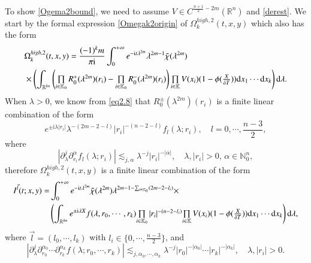 \documentclass[11pt,reqno]{amsart}
\def\d{{\rm d}}
\def\i{{\rm i}}
\numberwithin{equation}{section}
\theoremstyle{definition}
\begin{document}
To show \eqref{Ogema2bound}, we need to assume $V\in C^{\frac{n+1}{2}-2m}(\mathbb{R}^n)$ and \eqref{derest}. We start by the formal expression \eqref{Omegak2origin} of $\Omega_k^{high,2}(t,x,y)$ which also has the form
\begin{equation*}\label{Omegak2origin'}
	\begin{split}
		&\Omega_k^{high,2}(t,x,y)=\frac{(-1)^km}{\pi\i}\int_0^{+\infty}e^{-\mathrm{i}t\lambda^{2m}}\lambda^{2m-1}\tilde{\chi}(\lambda^{2m})\\
		&\times\left(\int_{\mathbb{R}^{kn}}\left(\mbox{$\prod\limits_{i\in\mathbb{K}_0}R_0^+(\lambda^{2m})(r_i)-\prod\limits_{i\in\mathbb{K}_0}R_0^-(\lambda^{2m})(r_i)$}\right)\mbox{$\prod\limits_{i\in\mathbb{K}}V(x_i)$}(1-\phi(\mbox{$\frac{X}{\delta T}$}))\d x_1\cdots \d x_k\right)\d\lambda.
	\end{split}
\end{equation*}
When $\lambda>0$, we know from \eqref{eq2.8} that $R_0^\pm(\lambda^{2m})(r_i)$ is a finite linear combination of the form
\begin{equation*}
	e^{\pm\mathrm{i}\lambda|r_i|}\lambda^{-(2m-2-l)}|r_i|^{-(n-2-l)}f_l(\lambda;r_i),\quad\mbox{$l=0,\cdots,\frac{n-3}{2}$},
\end{equation*}
where
\begin{equation*}
	|\partial_\lambda^j\partial_{r_i}^\alpha f_l(\lambda;r_i)|\lesssim_{j,\alpha}\lambda^{-j}|r_i|^{-|\alpha|},\quad\lambda,|r_i|>0,\,\alpha\in\mathbb{N}_0^n,
\end{equation*}
therefore $\Omega_k^{high,2}(t,x,y)$ is a finite linear combination of the form
\begin{equation}\label{Ivecl}
	\begin{split}
		I^{\vec{l}}(t;x,y)=&\int_0^{+\infty}e^{-\mathrm{i}t\lambda^{2m}}\tilde{\chi}(\lambda^{2m})\lambda^{2m-1-\sum_{i\in\mathbb{K}_0}(2m-2-l_i)}\times\\
		&\left(\int_{\mathbb{R}^{kn}}e^{\pm\mathrm{i}\lambda X}f(\lambda,r_0,\cdots,r_k)\mbox{$\prod\limits_{i\in\mathbb{K}_0}|r_i|^{-(n-2-l_i)}$}\mbox{$\prod\limits_{i\in\mathbb{K}}V(x_i)$}(1-\phi(\mbox{$\frac{X}{\delta T}$}))\d x_1\cdots \d x_k\right)\d\lambda,
	\end{split}
\end{equation}
where $\vec{l}=(l_0,\cdots,l_k)$ with $l_i\in\{\mbox{$0,\cdots,\frac{n-3}{2}$}\}$, and
\begin{equation*}\label{fsymbol}
	\left|\partial_\lambda^j\partial_{r_0}^{\alpha_0}\cdots\partial_{r_k}^{\alpha_k}f(\lambda;r_0,\cdots,r_k)\right|\lesssim_{j,\alpha_0,\cdots,\alpha_k}\lambda^{-j}|r_0|^{-|\alpha_0|}\cdots|r_k|^{-|\alpha_k|},\quad\lambda,|r_i|>0.
\end{equation*}
\end{document}
